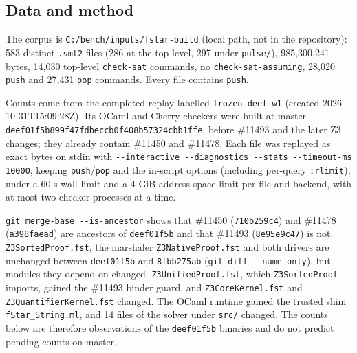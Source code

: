 \documentclass[10pt,a4paper]{article}
\begin{document}
\subsection{Data and method}\label{sec:a1-data-and-method}

The corpus is \texttt{C:\allowbreak{}/\allowbreak{}bench/\allowbreak{}inputs/\allowbreak{}fstar-{}\allowbreak{}build} (local path, not in the repository): 583 distinct \texttt{.\allowbreak{}smt2} files (286 at the top level, 297 under \texttt{pulse/\allowbreak{}}), 985,300,241 bytes, 14,030 top-level \texttt{check-{}\allowbreak{}sat} commands, no \texttt{check-{}\allowbreak{}sat-{}\allowbreak{}assuming}, 28,020 \texttt{push} and 27,431 \texttt{pop} commands. Every file contains \texttt{push}.

Counts come from the completed replay labelled \texttt{frozen-{}\allowbreak{}deef-{}\allowbreak{}w1} (created 2026-10-31T15:09:28Z). Its OCaml and Cherry checkers were built at master \texttt{deef01f5b899f47f\allowbreak{}dbeccb0f408b5732\allowbreak{}4cbb1ffe}, before \#11493 and the later Z3 changes; they already contain \#11450 and \#11478. Each file was replayed as exact bytes on stdin with \texttt{-{}\allowbreak{}-{}\allowbreak{}interactive -{}\allowbreak{}-{}\allowbreak{}diagnostics -{}\allowbreak{}-{}\allowbreak{}stats -{}\allowbreak{}-{}\allowbreak{}timeout-{}\allowbreak{}ms 10000}, keeping \texttt{push}/\texttt{pop} and the in-script options (including per-query \texttt{:\allowbreak{}rlimit}), under a 60 s wall limit and a 4 GiB address-space limit per file and backend, with at most two checker processes at a time.

\texttt{git merge-{}\allowbreak{}base -{}\allowbreak{}-{}\allowbreak{}is-{}\allowbreak{}ancestor} shows that \#11450 (\texttt{710b259c4}) and \#11478 (\texttt{a398faead}) are ancestors of \texttt{deef01f5b} and that \#11493 (\texttt{8e95e9c47}) is not. \texttt{Z3SortedProof.\allowbreak{}fst}, the marshaler \texttt{Z3NativeProof.\allowbreak{}fst} and both drivers are unchanged between \texttt{deef01f5b} and \texttt{8fbb275ab} (\texttt{git diff -{}\allowbreak{}-{}\allowbreak{}name-{}\allowbreak{}only}), but modules they depend on changed. \texttt{Z3UnifiedProof.\allowbreak{}fst}, which \texttt{Z3SortedProof} imports, gained the \#11493 binder guard, and \texttt{Z3CoreKernel.\allowbreak{}fst} and \texttt{Z3QuantifierKern\allowbreak{}el.\allowbreak{}fst} changed. The OCaml runtime gained the trusted shim \texttt{fStar\_\allowbreak{}String.\allowbreak{}ml}, and 14 files of the solver under \texttt{src/\allowbreak{}} changed. The counts below are therefore observations of the \texttt{deef01f5b} binaries and do not predict pending counts on master.
\end{document}
